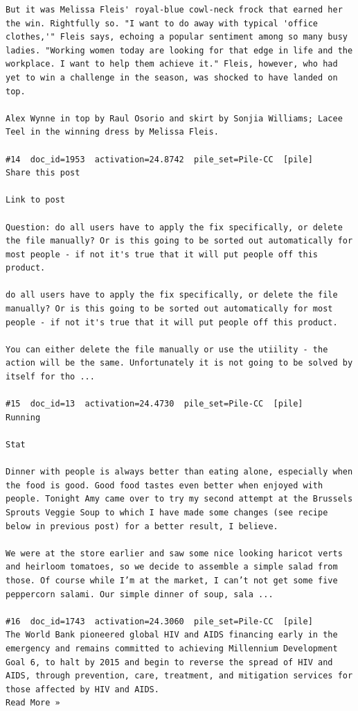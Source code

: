 \begin{verbatim}
But it was Melissa Fleis' royal-blue cowl-neck frock that earned her the win. Rightfully so. "I want to do away with typical 'office clothes,'" Fleis says, echoing a popular sentiment among so many busy ladies. "Working women today are looking for that edge in life and the workplace. I want to help them achieve it." Fleis, however, who had yet to win a challenge in the season, was shocked to have landed on top.

Alex Wynne in top by Raul Osorio and skirt by Sonjia Williams; Lacee Teel in the winning dress by Melissa Fleis.

#14  doc_id=1953  activation=24.8742  pile_set=Pile-CC  [pile]
Share this post

Link to post

Question: do all users have to apply the fix specifically, or delete the file manually? Or is this going to be sorted out automatically for most people - if not it's true that it will put people off this product.

do all users have to apply the fix specifically, or delete the file manually? Or is this going to be sorted out automatically for most people - if not it's true that it will put people off this product.

You can either delete the file manually or use the utiility - the action will be the same. Unfortunately it is not going to be solved by itself for tho ...

#15  doc_id=13  activation=24.4730  pile_set=Pile-CC  [pile]
Running

Stat

Dinner with people is always better than eating alone, especially when the food is good. Good food tastes even better when enjoyed with people. Tonight Amy came over to try my second attempt at the Brussels Sprouts Veggie Soup to which I have made some changes (see recipe below in previous post) for a better result, I believe.

We were at the store earlier and saw some nice looking haricot verts and heirloom tomatoes, so we decide to assemble a simple salad from those. Of course while I’m at the market, I can’t not get some five peppercorn salami. Our simple dinner of soup, sala ...

#16  doc_id=1743  activation=24.3060  pile_set=Pile-CC  [pile]
The World Bank pioneered global HIV and AIDS financing early in the emergency and remains committed to achieving Millennium Development Goal 6, to halt by 2015 and begin to reverse the spread of HIV and AIDS, through prevention, care, treatment, and mitigation services for those affected by HIV and AIDS.
Read More »


\end{verbatim}
